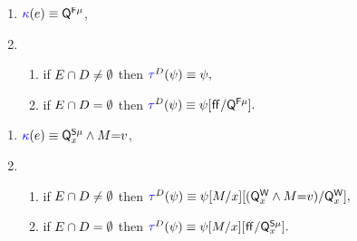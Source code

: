  \begin{enumerate}[topsep=0pt,label=(\textsc{f}\arabic*),ref=\textsc{f}\arabic*]
    \setcounter{enumi}{\value{Bkappa}}
  \item \label{fence-kappa-q}
    ${\color{blue}\kappa}(e) \mathrel{\equiv} \mathsf{Q}^{\smash{\mathsf{F}\mu}}_{}$,
  \item[] 
    \begin{enumerate}[leftmargin=0pt]
      \item \label{fence-tau-dep-q}
        if $E\cap D\neq\emptyset$ then
      \begin{math}
        \aTr{\bEvs}{\bForm} \riff 
        \bForm,
      \end{math}
      \item \label{fence-tau-ind-q}
        if $E\cap D=\emptyset$ then
      \begin{math}
        \aTr{\bEvs}{\bForm} \riff 
        \bForm
        [\FALSE/\QF{}{\amode}].
      \end{math}
    \end{enumerate}
  \end{enumerate}
  \smallskip

  \begin{enumerate}[topsep=0pt,label=(\textsc{w}\arabic*),ref=\textsc{w}\arabic*]
    \setcounter{enumi}{\value{Bkappa}}
  \item \label{write-kappa-q}
    \begin{math}
      {\color{blue}\kappa}(e) \mathrel{\equiv}
      \mathsf{Q}^{\smash{\mathsf{S}\mu}}_{x}
      \land
      M{=}v
    \end{math},
  \item[] 
    \begin{enumerate}[leftmargin=0pt]
      \item \label{write-tau-dep-q}
        if $E\cap D\neq\emptyset$ then
      \begin{math}
        \aTr{\bEvs}{\bForm} \riff 
        \bForm
        [\aExp/\aLoc][(\Qw{\aLoc}\land\aExp{=}\aVal)/\Qw{\aLoc}],
      \end{math}
      \item \label{write-tau-ind-q}
        if $E\cap D=\emptyset$ then
      \begin{math}
        \aTr{\bEvs}{\bForm} \riff 
        \bForm
        [\aExp/\aLoc][\FALSE/\QS{\aLoc}{\amode}].
      \end{math}
    \end{enumerate}
  \end{enumerate}
  \smallskip

